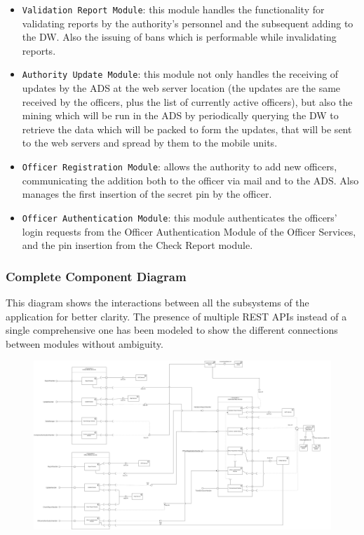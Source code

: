 \documentclass[12pt,a4paper]{article}
\begin{document}
\begin{itemize}
	\item \texttt{Validation Report Module}: this module handles the functionality for validating reports by the authority's personnel and the subsequent adding to the DW.  Also the issuing of bans which is performable while invalidating reports.
	\item \texttt{Authority Update Module}: this module not only handles the receiving of updates by the ADS at the web server location (the updates are the same received by the officers, plus the list of currently active officers), but also the mining which will be run in the ADS by periodically querying the DW to retrieve the data which will be packed to form the updates, that will be sent to the web servers and spread by them to the mobile units.
	\item \texttt{Officer Registration Module}: allows the authority to add new officers, communicating the addition both to the officer via mail and to the ADS. Also manages the first insertion of the secret pin by the officer.
	\item \texttt{Officer Authentication Module}: this module authenticates the officers' login requests from the Officer Authentication Module of the Officer Services, and the pin insertion from the Check Report module.
\end{itemize}
\newpage
\subsubsection{Complete Component Diagram}
This diagram shows the interactions between all the subsystems of the application for better clarity. The presence of multiple REST APIs instead of a single comprehensive one has been modeled to show the different connections between modules without ambiguity.
\begin{figure}[H]
				\centering
					\begin{adjustwidth}{-25mm}{-25mm}
					        \includegraphics[width=0.95\paperwidth]{Images/OverallComponent}
					\end{adjustwidth}
			\end{figure}
\newpage
\end{document}
